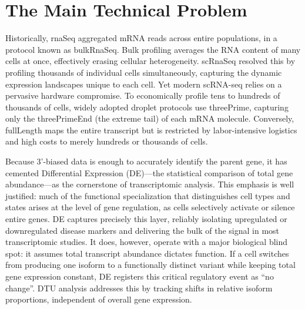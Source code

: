\section{The Main Technical Problem}
Historically, \gls{rnaSeq} aggregated mRNA \glspl{read} across entire populations, in a protocol known as \gls{bulkRnaSeq}. Bulk profiling averages the RNA content of many cells at once, effectively erasing cellular heterogeneity. \gls{scRnaSeq} resolved this by profiling thousands of individual cells simultaneously, capturing the dynamic expression landscapes unique to each cell. Yet modern scRNA-seq relies on a pervasive hardware compromise. To economically profile tens to hundreds of thousands of cells, widely adopted droplet protocols use \gls{threePrime}, capturing only the \gls{threePrimeEnd} (the extreme tail) of each mRNA molecule. Conversely, \gls{fullLength} maps the entire transcript but is restricted by labor-intensive logistics and high costs to merely hundreds or thousands of cells.

Because 3'-biased data is enough to accurately identify the parent gene, it has cemented Differential Expression (DE)---the statistical comparison of total gene abundance---as the cornerstone of transcriptomic analysis. This emphasis is well justified: much of the functional specialization that distinguishes cell types and states arises at the level of gene regulation, as cells selectively activate or silence entire genes. DE captures precisely this layer, reliably isolating upregulated or downregulated disease markers and delivering the bulk of the signal in most transcriptomic studies. It does, however, operate with a major biological blind spot: it assumes total transcript abundance dictates function. If a cell switches from producing one isoform to a functionally distinct variant while keeping total gene expression constant, DE registers this critical regulatory event as ``no change''. DTU analysis addresses this by tracking shifts in relative isoform proportions, independent of overall gene expression.

